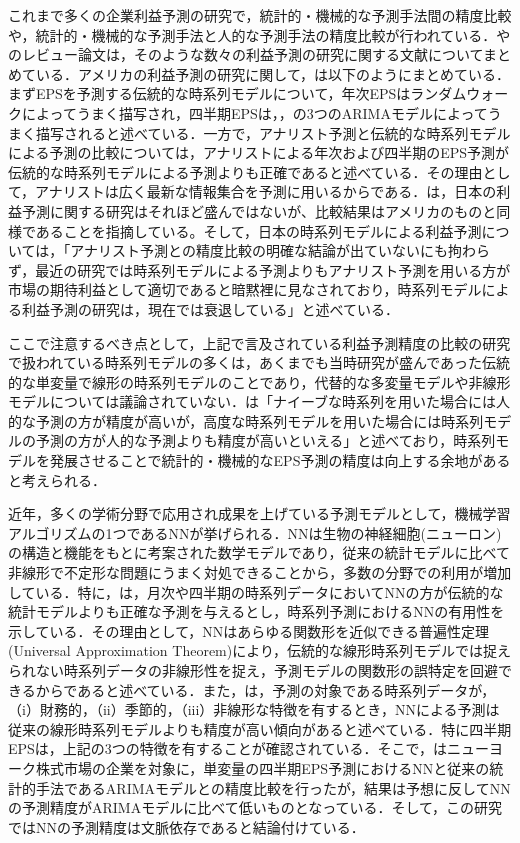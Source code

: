 \documentclass[a4paper，11pt]{jsarticle}
\begin{document}
これまで多くの企業利益予測の研究で，統計的・機械的な予測手法間の精度比較や，統計的・機械的な予測手法と人的な予測手法の精度比較が行われている．\cite{sakurai1990}や\cite{ota2006}のレビュー論文は，そのような数々の利益予測の研究に関する文献についてまとめている．アメリカの利益予測の研究に関して，\cite{sakurai1990}は以下のようにまとめている．まずEPSを予測する伝統的な時系列モデルについて，年次EPSはランダムウォークによってうまく描写され，四半期EPSは\cite*{brown1979univariate}，\cite{griffin1977time}，\cite{foster1977quarterly}の3つのARIMAモデルによってうまく描写されると述べている．一方で，アナリスト予測と伝統的な時系列モデルによる予測の比較については，アナリストによる年次および四半期のEPS予測が伝統的な時系列モデルによる予測よりも正確であると述べている．その理由として，アナリストは広く最新な情報集合を予測に用いるからである．\cite{ota2006}は，日本の利益予測に関する研究はそれほど盛んではないが、比較結果はアメリカのものと同様であることを指摘している。そして，日本の時系列モデルによる利益予測については，「アナリスト予測との精度比較の明確な結論が出ていないにも拘わらず，最近の研究では時系列モデルによる予測よりもアナリスト予測を用いる方が市場の期待利益として適切であると暗黙裡に見なされており，時系列モデルによる利益予測の研究は，現在では衰退している」と述べている．

ここで注意するべき点として，上記で言及されている利益予測精度の比較の研究で扱われている時系列モデルの多くは，あくまでも当時研究が盛んであった伝統的な単変量で線形の時系列モデルのことであり，代替的な多変量モデルや非線形モデルについては議論されていない．\cite{ota2006}は「ナイーブな時系列を用いた場合には人的な予測の方が精度が高いが，高度な時系列モデルを用いた場合には時系列モデルの予測の方が人的な予測よりも精度が高いといえる」と述べており，時系列モデルを発展させることで統計的・機械的なEPS予測の精度は向上する余地があると考えられる．

近年，多くの学術分野で応用され成果を上げている予測モデルとして，機械学習アルゴリズムの1つであるNNが挙げられる．NNは生物の神経細胞(ニューロン)の構造と機能をもとに考案された数学モデルであり，従来の統計モデルに比べて非線形で不定形な問題にうまく対処できることから，多数の分野での利用が増加している\citep*{tkavc2016artificial}．特に，\cite{hill1996neural}は，月次や四半期の時系列データにおいてNNの方が伝統的な統計モデルよりも正確な予測を与えるとし，時系列予測におけるNNの有用性を示している．その理由として，NNはあらゆる関数形を近似できる普遍性定理(Universal Approximation Theorem)\citep{hornik1989multilayer}により，伝統的な線形時系列モデルでは捉えられない時系列データの非線形性を捉え，予測モデルの関数形の誤特定を回避できるからであると述べている．また，\cite{hill1994artificial}は，予測の対象である時系列データが，（i）財務的，（ii）季節的，（iii）非線形な特徴を有するとき，NNによる予測は従来の線形時系列モデルよりも精度が高い傾向があると述べている．特に四半期EPSは，上記の3つの特徴を有することが確認されている\citep*{hopwood1986univariate}．そこで，\cite{callen1996neural}はニューヨーク株式市場の企業を対象に，単変量の四半期EPS予測におけるNNと従来の統計的手法であるARIMAモデルとの精度比較を行ったが，結果は予想に反してNNの予測精度がARIMAモデルに比べて低いものとなっている．そして，この研究ではNNの予測精度は文脈依存であると結論付けている．
\end{document}
